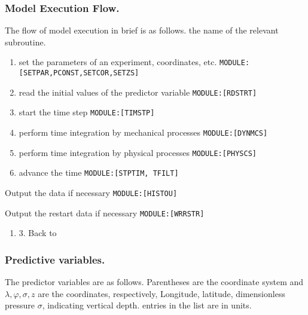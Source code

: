 \hypertarget{model-execution-flow.}{%
\subsubsection{Model Execution Flow.}\label{model-execution-flow.}}

The flow of model execution in brief is as follows. \is the name of the
relevant subroutine.

\begin{enumerate}
\def\labelenumi{\arabic{enumi}.}
\item
  set the parameters of an experiment, coordinates, etc.
  \texttt{MODULE:{[}SETPAR,PCONST,SETCOR,SETZS{]}}
\item
  read the initial values of the predictor variable
  \texttt{MODULE:{[}RDSTRT{]}}
\item
  start the time step \texttt{MODULE:{[}TIMSTP{]}}
\item
  perform time integration by mechanical processes
  \texttt{MODULE:{[}DYNMCS{]}}
\item
  perform time integration by physical processes
  \texttt{MODULE:{[}PHYSCS{]}}
\item
  advance the time \texttt{MODULE:{[}STPTIM,\ TFILT{]}}
\end{enumerate}

Output the data if necessary \texttt{MODULE:{[}HISTOU{]}}

Output the restart data if necessary \texttt{MODULE:{[}WRRSTR{]}}

\begin{enumerate}
\def\labelenumi{\arabic{enumi}.}
\setcounter{enumi}{8}
\tightlist
\item
  3. Back to
\end{enumerate}

\hypertarget{predictive-variables.}{%
\subsubsection{Predictive variables.}\label{predictive-variables.}}

The predictor variables are as follows. Parentheses are the coordinate
system and \(\lambda,\varphi,\sigma, z\) are the coordinates,
respectively, Longitude, latitude, dimensionless pressure \(\sigma\),
indicating vertical depth. \The entries in the list are in units.

